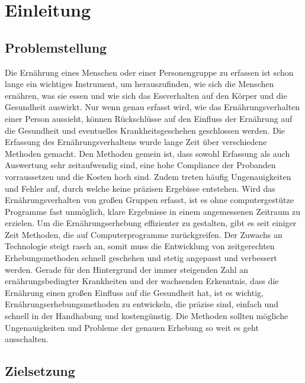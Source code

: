 
\section{Einleitung}

\subsection{Problemstellung}
Die Ernährung eines Menschen oder einer Personengruppe zu erfassen ist schon lange ein wichtiges Instrument, um herauszufinden, wie sich die Menschen ernähren, was sie essen und wie sich das Essverhalten auf den Körper und die Gesundheit auswirkt. Nur wenn genau erfasst wird, wie das Ernährungsverhalten einer Person aussieht, können Rückschlüsse auf den Einfluss der Ernährung auf die Gesundheit und eventuelles Krankheitsgeschehen geschlossen werden. 
Die Erfassung des Ernährungsverhaltens wurde lange Zeit über verschiedene Methoden gemacht. Den Methoden gemein ist, dass sowohl Erfassung als auch Auswertung sehr zeitaufwendig sind, eine hohe Compliance der Probanden vorraussetzen und die Kosten hoch sind. Zudem treten häufig Ungenauigkeiten und Fehler auf, durch welche keine präzisen Ergebisse entstehen. 
Wird das Ernährungsverhalten von großen Gruppen erfasst, ist es ohne computergestütze Programme fast unmöglich, klare Ergebnisse in einem angemessenen Zeitraum zu erzielen. 
Um die Ernährungserhebung effizienter zu gestalten, gibt es seit einiger Zeit Methoden, die auf Computerprogramme zurückgreifen. Der Zuwachs an Technologie steigt rasch an, somit muss die Entwicklung von zeitgerechten Erhebungsmethoden schnell geschehen und stetig angepasst und verbessert werden. 
Gerade für den Hintergrund der immer steigenden Zahl an ernährungsbedingter Krankheiten und der wachsenden Erkenntnis, dass die Ernährung einen großen Einfluss auf die Gesundheit hat, ist es wichtig, Ernährungserhebungsmethoden zu entwickeln, die präzise sind, einfach und schnell in der Handhabung und kostengünstig. Die Methoden sollten mögliche Ungenauigkeiten und Probleme der genauen Erhebung so weit es geht ausschalten. 

\subsection{Zielsetzung}

